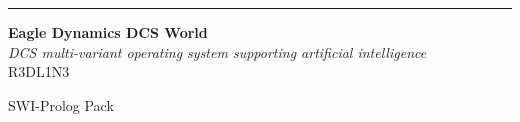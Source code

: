 \documentclass[11pt]{report}
\begin{document}
\begin{titlepage}
    \raggedleft
    \rule{1pt}{\textheight}
    \hspace{0.05\textwidth}
    \parbox[b]{0.75\textwidth}{
        {\Huge\bfseries Eagle Dynamics DCS World}
        \\[2\baselineskip]
        {\large\textit{DCS multi-variant operating system supporting artificial intelligence}}
        \\[4\baselineskip]
        {\Large\textsc{R3DL1N3}}

        \vspace{0.5\textheight}
        {\noindent SWI-Prolog Pack}\\[\baselineskip]
    }
\end{titlepage}


\printindex
\end{document}
